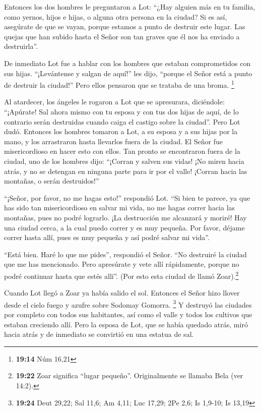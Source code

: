  Entonces los dos hombres le preguntaron a Lot: ``¿Hay
alguien más en tu familia, como yernos, hijos e hijas, o alguna otra
persona en la ciudad? Si es así, asegúrate de que se vayan,
 porque estamos a punto de destruir este lugar. Las
quejas que han subido hasta el Señor son tan graves que él nos ha
enviado a destruirla''.

 De inmediato Lot fue a hablar con los hombres que
estaban comprometidos con sus hijas. ``¡Levántense y salgan de aquí!''
les dijo, ``porque el Señor está a punto de destruir la ciudad!'' Pero
ellos pensaron que se trataba de una broma. \footnote{\textbf{19:14} Núm
  16,21}

 Al atardecer, los ángeles le rogaron a Lot que se
apresurara, diciéndole: ``¡Apúrate! Sal ahora mismo con tu esposa y con
tus dos hijas de aquí, de lo contrario serán destruidas cuando caiga el
castigo sobre la ciudad''.  Pero Lot dudó. Entonces los
hombres tomaron a Lot, a su esposa y a sus hijas por la mano, y los
arrastraron hasta llevarlos fuera de la ciudad. El Señor fue
misericordioso en hacer esto con ellos.  Tan pronto se
encontraron fuera de la ciudad, uno de los hombres dijo: ``¡Corran y
salven sus vidas! ¡No miren hacia atrás, y no se detengan en ninguna
parte para ir por el valle! ¡Corran hacia las montañas, o serán
destruidos!''

 ``¡Señor, por favor, no me hagas esto!'' respondió Lot.
 ``Si bien te parece, ya que has sido tan misericordioso
en salvar mi vida, no me hagas correr hacia las montañas, pues no podré
lograrlo. ¡La destrucción me alcanzará y moriré!  Hay una
ciudad cerca, a la cual puedo correr y es muy pequeña. Por favor, déjame
correr hasta allí, pues es muy pequeña y así podré salvar mi vida''.

 ``Está bien. Haré lo que me pides'', respondió el Señor.
``No destruiré la ciudad que me has mencionado.  Pero
apresúrate y vete allí rápidamente, porque no podré continuar hasta que
estés allí''. (Por esto esta ciudad de llamó Zoar).\footnote{\textbf{19:22}
  Zoar significa ``lugar pequeño''. Originalmente se llamaba Bela (ver
  14:2).}

 Cuando Lot llegó a Zoar ya había salido el sol.
 Entonces el Señor hizo llover desde el cielo fuego y
azufre sobre Sodomay Gomorra. \footnote{\textbf{19:24} Deut 29,22; Sal
  11,6; Am 4,11; Luc 17,29; 2Pe 2,6; Is 1,9-10; Is 13,19}
 Y destruyó las ciudades por completo con todos sus
habitantes, así como el valle y todos los cultivos que estaban creciendo
allí.  Pero la esposa de Lot, que se había quedado atrás,
miró hacia atrás y de inmediato se convirtió en una estatua de sal.

